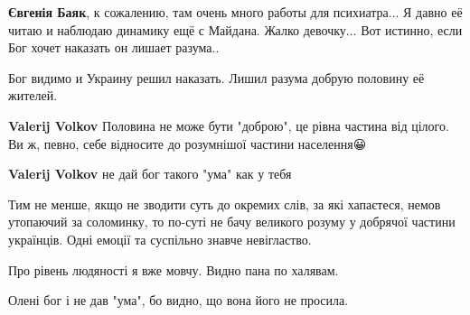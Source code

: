 \begin{itemize}
\begin{itemize}
 
\textbf{Євгенія Баяк}, к сожалению, там очень много работы для психиатра... Я
давно её читаю и наблюдаю динамику ещё с Майдана. Жалко девочку... Вот истинно,
если Бог хочет наказать он лишает разума..

 
Бог видимо и Украину решил наказать.
Лишил разума добрую половину её жителей.

 
\textbf{Valerij Volkov} Половина не може бути "доброю", це рівна частина від цілого. Ви ж, певно, себе відносите до розумнішої частини населення😀

 
\textbf{Valerij Volkov} не дай бог такого "ума" как у тебя 🥴

 

Тим не менше, якщо не зводити суть до окремих слів, за які хапаєтеся, немов
утопаючий за соломинку, то по-суті не бачу великого розуму у добрячої частини
українців. Одні емоції та суспільно знавче невігластво.

Про рівень людяності я вже мовчу. Видно пана по халявам.

 
Олені бог і не дав "ума", бо видно, що вона його не просила.

\end{itemize}

\end{itemize}

